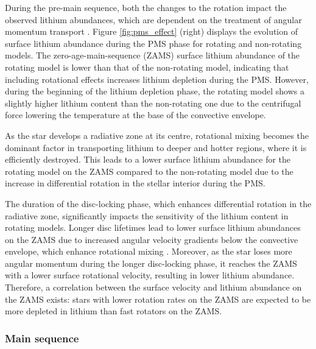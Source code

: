 During the pre-main sequence, both the changes to the rotation impact the observed lithium abundances, which are dependent on the treatment of angular momentum transport \citep{dumont_lithium_2021}.
Figure \ref{fig:pms_effect} (right) displays the evolution of surface lithium abundance during the PMS phase for rotating and non-rotating models. 
The zero-age-main-sequence (ZAMS) surface lithium abundance of the rotating model is lower than that of the non-rotating model, indicating that including rotational effects increases lithium depletion during the PMS. 
However, during the beginning of the lithium depletion phase, the rotating model shows a slightly higher lithium content than the non-rotating one due to the centrifugal force lowering the temperature at the base of the convective envelope.

As the star develops a radiative zone at its centre, rotational mixing becomes the dominant factor in transporting lithium to deeper and hotter regions, where it is efficiently destroyed. 
This leads to a lower surface lithium abundance for the rotating model on the ZAMS compared to the non-rotating model due to the increase in differential rotation in the stellar interior during the PMS.

The duration of the disc-locking phase, which enhances differential rotation in the radiative zone, significantly impacts the sensitivity of the lithium content in rotating models. 
Longer disc lifetimes lead to lower surface lithium abundances on the ZAMS due to increased angular velocity gradients below the convective envelope, which enhance rotational mixing \citep{eggenberger_angular_2012}. 
Moreover, as the star loses more angular momentum during the longer disc-locking phase, it reaches the ZAMS with a lower surface rotational velocity, resulting in lower lithium abundance.
Therefore, a correlation between the surface velocity and lithium abundance on the ZAMS exists: stars with lower rotation rates on the ZAMS are expected to be more depleted in lithium than fast rotators on the ZAMS.

\subsubsection{Main sequence}


